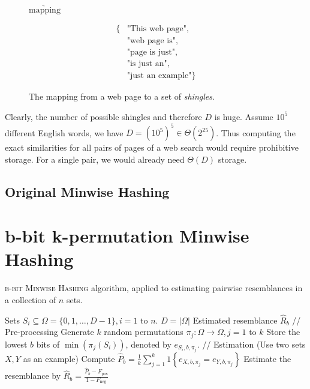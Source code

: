 \documentclass[a4paper]{article}
\begin{document}
\begin{figure}[h]
\begin{center}
\hspace{1cm} $\underrightarrow{\text{mapping}}$ \hspace{1cm}
\parbox{2cm}{
\begin{equation*}
\begin{split}
 \text{\{} & \text{"This web page"},\\ & \text{"web page is"},\\ & \text{"page is just"},\\ & \text{"is just an"},\\ & \text{"just an example"} \text{\}}
\end{split}
\end{equation*}
}
\end{center}
\caption{The mapping from a web page to a set of \emph{shingles}.}
\label{fig:shingle}
\end{figure}

Clearly, the number of possible shingles and therefore $D$ is huge. Assume $10^5$ different English words, we have $D=\left(10^5\right)^5 \in \Theta\left(2^{25}\right)$. Thus computing the exact similarities for all pairs of pages of a web search would require prohibitive storage. For a single pair, we would already need $\Theta(D)$ storage.

\subsection{Original Minwise Hashing}

\section{b-bit k-permutation Minwise Hashing}

\begin{algorithm}[H]
\caption{\textsc{b-bit Minwise Hashing} algorithm, applied to estimating pairwise resemblances in a collection of $n$ sets.}
\label{MinwiseHashingAlg}
\begin{algorithmic}
\Require Sets $S_i \subseteq \Omega = \{0,1,\ldots,D-1\}, i = 1 \text{ to } n$. \Comment $D = \left| \Omega \right|$
\Ensure Estimated resemblance $\hat{R}_b$
\State // Pre-processing
\State Generate $k$ random permutations $\pi_j: \Omega\longrightarrow\Omega, j=1\text{ to }k$
	\State Store the lowest $b$ bits of $\min(\pi_j(S_i))$, denoted by $e_{S_i,b,\pi_j}$.
\EndFor
\State
\State // Estimation (Use two sets $X,Y$ as an example)
\State Compute $\hat{P}_b = \frac{1}{k}\sum_{j=1}^k 1 \left\lbrace  e_{X,b,\pi_j } = e_{Y,b,\pi_j } \right\rbrace$
\State Estimate the resemblance by $\hat{R}_b = \frac{\hat{P}_b-F_{\text{pos}}}{1-F_{\text{neg}}}$
\end{algorithmic}
\end{algorithm}
\end{document}
